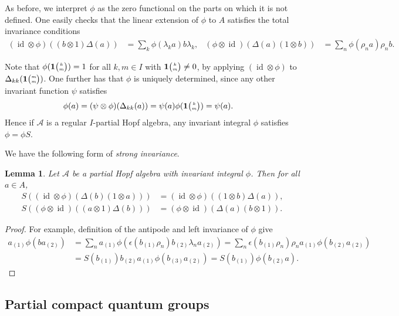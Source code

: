 \documentclass[10pt]{article}
\DeclareMathOperator{\id}{id}
\newcommand{\Grt}[3]{#1{\tiny {\begin{pmatrix} #2\\#3\end{pmatrix}}}}
\newcommand{\UnitC}[2]{\Grt{\mathbf{1}}{#1}{#2}}
\newtheorem{Lem}[Theorem]{Lemma}
\theoremstyle{definition}
\numberwithin{equation}{section}
\begin{document}
As before, we interpret $\phi$ as the zero functional on the parts on which it is not defined. One easily checks that the linear extension of $\phi$ to $A$ satisfies the total invariance conditions \begin{align*}
(\id\otimes \phi)((b\otimes 1)\Delta(a)) &= \sum_{k}\phi(\lambda_{k}a)b\lambda_k,&  (\phi\otimes \id)(\Delta(a)(1\otimes b)) &= \sum_{n}
\phi(\rho_{n} a)\rho_n b.\end{align*}

Note that $\phi(\UnitC{k}{m})=1$ for all $k,m\in I$ with $\UnitC{k}{m}\neq 0$, by applying $(\id\otimes \phi)$ to $\Delta_{kk}(\UnitC{m}{m})$. One further has that $\phi$ is uniquely determined, since any other invariant function $\psi$ satisfies \begin{align*}  \phi(a)  &= (\psi \otimes
      \phi)(\Delta_{kk}(a)) = \psi(a)\phi(\UnitC{k}{m}) = \psi(a) .
    \end{align*}
Hence if $\mathscr{A}$ is a  regular  $I$-partial Hopf algebra, any invariant integral $\phi$ satisfies $\phi=\phi S$.

We have the following form of \emph{strong invariance}.

\begin{Lem} \label{lemma:strong-invariance}
  Let $\mathscr{A}$ be a partial Hopf algebra with invariant integral $\phi$. Then
  for all $a\in A$,
  \begin{align*}
    S\left(( \id\otimes
    \phi)(\Delta(b)(1 \otimes a))\right) &= (\id \otimes \phi)((1 \otimes b)\Delta(a)),\\  S\left((\phi \otimes
    \id)((a\otimes 1)\Delta(b))\right) &= (\phi \otimes \id)(\Delta(a)(b\otimes 1)).\end{align*}
\end{Lem}
\begin{proof}
 For example, definition of the antipode and left invariance of $\phi$ give
  \begin{align*}
    a_{(1)}\phi(ba_{(2)}) &= \sum_{n}
    a_{(1)}\phi(\epsilon(b_{(1)}\rho_{n})b_{(2)}\lambda_{n}a_{(2)}) 
= \sum_{n} \epsilon(b_{(1)}\rho_{n})\rho_{n}a_{(1)}\phi(b_{(2)}a_{(2)})
\\
&= S(b_{(1)})b_{(2)}a_{(1)}\phi(b_{(3)}a_{(2)}) =
S(b_{(1)})\phi(b_{(2)}a).
  \end{align*}
\end{proof}


\subsection{Partial compact quantum groups}
\end{document}
